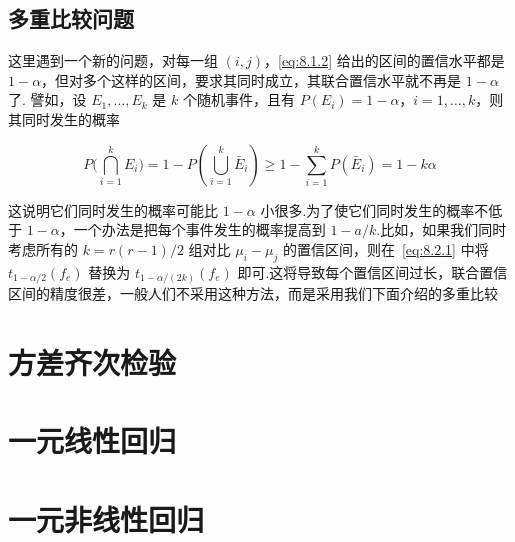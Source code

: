 \subsection{多重比较问题}

这里遇到一个新的问题，对每一组 $(i, j)$，\eqref{eq:8.1.2} 给出的区间的置信水平都是 $1-\alpha$，但对多个这样的区间，要求其同时成立，其联合置信水平就不再是  $1-\alpha$ 了. 譬如，设 $E_1,\ldots, E_k$ 是 $k$ 个随机事件，且有 $P(E_i)=1-\alpha$，$i=1,\ldots, k$，则其同时发生的概率 

\begin{equation}
  P\big(\bigcap_{i=1}^{k} E_{i}\big)=1-P\left(\bigcup_{i=1}^{k} \bar{E}_{i}\right) \geqslant 1-\sum_{i=1}^{k} P\left(\bar{E}_{i}\right)=1-k \alpha
\end{equation}

这说明它们同时发生的概率可能比 $1-\alpha$ 小很多.为了使它们同时发生的概率不低于 $1-\alpha$，一个办法是把每个事件发生的概率提高到 $1-a/k$.比如，如果我们同时考虑所有的 $k = r(r-1)/2$ 组对比 $\mu_i - \mu_j$ 的置信区间，则在~\eqref{eq:8.2.1} 中将 $t_{1-\alpha/2}(f_e)$ 替换为 $t_{1-\alpha/(2k)}(f_e)$ 即可.这将导致每个置信区间过长，联合置信区间的精度很差，一般人们不采用这种方法，而是采用我们下面介绍的多重比较

\section{方差齐次检验}\label{sec:8.3}

\section{一元线性回归}\label{sec:8.4}

\section{一元非线性回归}\label{sec:8.5}